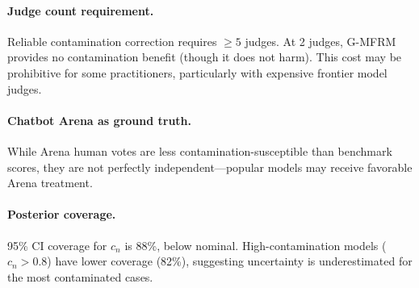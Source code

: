 \documentclass[11pt]{article}
\newcommand{\gmfrm}{G-MFRM}
\newcommand{\cn}{c_n}
\begin{document}
\paragraph{Judge count requirement.}
Reliable contamination correction requires $\geq 5$ judges.
At 2 judges, \gmfrm{} provides no contamination benefit (though it does not harm).
This cost may be prohibitive for some practitioners, particularly with expensive frontier model judges.

\paragraph{Chatbot Arena as ground truth.}
While Arena human votes are less contamination-susceptible than benchmark scores, they are not perfectly independent---popular models may receive favorable Arena treatment.

\paragraph{Posterior coverage.}
95\% CI coverage for $\cn$ is 88\%, below nominal.
High-contamination models ($\cn > 0.8$) have lower coverage (82\%), suggesting uncertainty is underestimated for the most contaminated cases.


\end{document}
